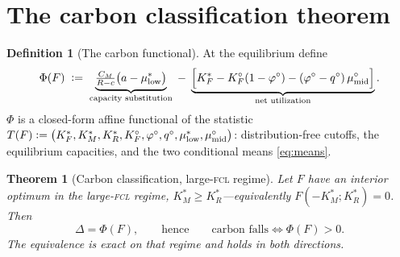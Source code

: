 \documentclass[11pt,reqno]{amsart}
\theoremstyle{plain}
\newtheorem{theorem}{Theorem}
\theoremstyle{definition}
\newtheorem*{cardef}{Definition}
\theoremstyle{remark}
\theoremstyle{remark}\newtheorem{observation}{Observation}
\newcommand{\KRs}{K_R^{*}}\newcommand{\KFs}{K_F^{*}}\newcommand{\KMs}{K_M^{*}}
\newcommand{\mustar}{\mu^{*}_{\mathrm{low}}}\newcommand{\mumid}{\mu^{\circ}_{\mathrm{mid}}}
\newcommand{\phio}{\varphi^{\circ}}\newcommand{\qo}{q^{\circ}}
\begin{document}
\section{The carbon classification theorem}\label{sec:classify}

\begin{cardef}[The carbon functional]
At the equilibrium define
\begin{equation}\label{eq:Phi}
  \Phi(F)\;\eqdef\;
  \underbrace{\tfrac{\CM}{R-c}\big(a-\mustar\big)}_{\text{capacity substitution}}
  \;-\;
  \underbrace{\Big[\KFs-\KFo(1-\phio)-(\phio-\qo)\,\mumid\Big]}_{\text{net utilization}} .
\end{equation}
$\Phi$ is a closed-form affine functional of the statistic
$T(F)\eqdef\big(\KFs,\KMs,\KRs,\KFo,\phio,\qo,\mustar,\mumid\big)$: distribution-free
cutoffs, the equilibrium capacities, and the two conditional means \eqref{eq:means}.
\end{cardef}

\begin{theorem}[Carbon classification, large-\textsc{fcl} regime]\label{thm:classify}
Let $F$ have an interior optimum \emph{in the large-\textsc{fcl} regime},
$\KMs\ge\KRs$---equivalently $F(-\KMs;\KRs)=0$. Then
\[
  \boxed{\;\Delta=\Phi(F),\qquad\text{hence}\qquad \text{carbon falls}\iff \Phi(F)>0.\;}
\]
The equivalence is exact on that regime and holds in both directions.
\end{theorem}
\end{document}
